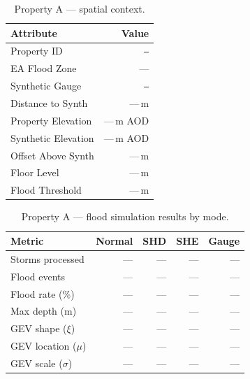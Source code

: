 \documentclass[11pt,a4paper]{article}
\begin{document}
\begin{table}[H]
    \centering
    \caption{Property A --- spatial context.}
    \begin{tabular}{lr}
        \toprule
        \textbf{Attribute} & \textbf{Value} \\
        \midrule
        Property ID          & \texttt{---} \\
        EA Flood Zone        & --- \\
        Synthetic Gauge      & \texttt{---} \\
        Distance to Synth    & ---\,m \\
        Property Elevation   & ---\,m AOD \\
        Synthetic Elevation  & ---\,m AOD \\
        Offset Above Synth   & ---\,m \\
        Floor Level          & ---\,m \\
        Flood Threshold      & ---\,m \\
        \bottomrule
    \end{tabular}
\end{table}

\begin{table}[H]
    \centering
    \caption{Property A --- flood simulation results by mode.}
    \begin{tabular}{lrrrr}
        \toprule
        \textbf{Metric} & \textbf{Normal} & \textbf{SHD} & \textbf{SHE} & \textbf{Gauge} \\
        \midrule
        Storms processed       & --- & --- & --- & --- \\
        Flood events           & --- & --- & --- & --- \\
        Flood rate (\%)        & --- & --- & --- & --- \\
        Max depth (m)          & --- & --- & --- & --- \\
        GEV shape ($\xi$)      & --- & --- & --- & --- \\
        GEV location ($\mu$)   & --- & --- & --- & --- \\
        GEV scale ($\sigma$)   & --- & --- & --- & --- \\
        \bottomrule
    \end{tabular}
\end{table}
\end{document}
